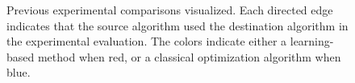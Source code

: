 \documentclass[../paper.tex]{subfiles}
\begin{document}
\begin{figure}

    \caption{Previous experimental comparisons visualized. Each directed edge indicates that the source algorithm used the destination algorithm in the experimental evaluation. The colors indicate either a learning-based method when red, or a classical optimization algorithm when blue.}
    \label{fig:comparisons}
\end{figure}

\ifSubfilesClassLoaded{%
}{}
\end{document}
